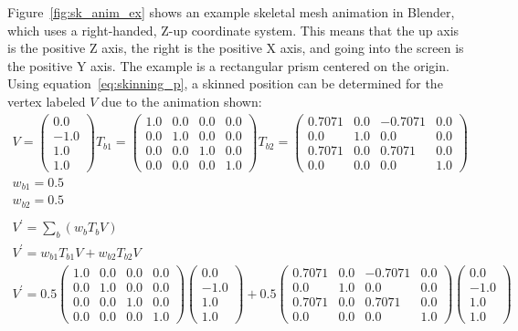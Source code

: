 Figure~\ref{fig:sk_anim_ex} shows an example skeletal mesh animation in Blender, which uses a right-handed, Z-up coordinate system.
This means that the up axis is the positive Z axis, the right is the positive X axis, and going into the screen is the positive Y axis.
The example is a rectangular prism centered on the origin.
Using equation~\ref{eq:skinning_p}, a skinned position can be determined for the vertex labeled $V$ due to the animation shown:
\begin{gather}
 \label{eq:skinning_ex}
 V = \left(\begin{array}{c}0.0\\-1.0\\1.0\\1.0\end{array}\right)
 T_{b1} = \left(\begin{array}{cccc}1.0&0.0&0.0&0.0\\0.0&1.0&0.0&0.0\\0.0&0.0&1.0&0.0\\0.0&0.0&0.0&1.0\end{array}\right)
 T_{b2} = \left(\begin{array}{cccc}0.7071&0.0&-0.7071&0.0\\0.0&1.0&0.0&0.0\\0.7071&0.0&0.7071&0.0\\0.0&0.0&0.0&1.0\end{array}\right)\nonumber\\
 w_{b1} = 0.5\nonumber\\
 w_{b2} = 0.5\nonumber\\\nonumber\\
 V^\prime = \sum_b{\left(w_bT_bV\right)}\nonumber\\
 V^\prime = w_{b1}T_{b1}V + w_{b2}T_{b2}V\nonumber\\
 V^\prime = 0.5\left(\begin{array}{cccc}1.0&0.0&0.0&0.0\\0.0&1.0&0.0&0.0\\0.0&0.0&1.0&0.0\\0.0&0.0&0.0&1.0\end{array}\right)\left(\begin{array}{c}0.0\\-1.0\\1.0\\1.0\end{array}\right) + 0.5\left(\begin{array}{cccc}0.7071&0.0&-0.7071&0.0\\0.0&1.0&0.0&0.0\\0.7071&0.0&0.7071&0.0\\0.0&0.0&0.0&1.0\end{array}\right)\left(\begin{array}{c}0.0\\-1.0\\1.0\\1.0\end{array}\right)
\end{gather}


